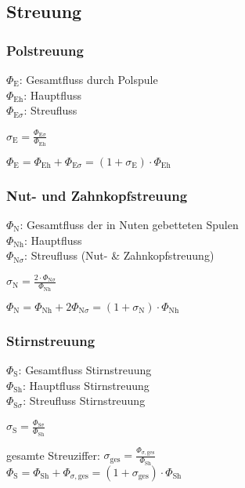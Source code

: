 \begin{sectionbox}
\subsection{Streuung}
\subsubsection{Polstreuung}
\begin{minipage}{0.7\columnwidth}
$\Phi_\text{E}$: Gesamtfluss durch Polspule \\
$\Phi_\text{Eh}$: Hauptfluss \\
$\Phi_{\text{E}\sigma}$: Streufluss
\end{minipage}
\begin{minipage}{0.25\columnwidth}
$\sigma_\text{E} = \frac{\Phi_{\text{E}\sigma}}{\Phi_\text{Eh}}$
\end{minipage}
$\Phi_\text{E} = \Phi_\text{Eh} + \Phi_{\text{E}\sigma} = (1+\sigma_\text{E})\cdot \Phi_\text{Eh}$
\\
\subsubsection{Nut- und Zahnkopfstreuung}
\begin{minipage}{0.7\columnwidth}
$\Phi_\text{N}$: Gesamtfluss der in Nuten gebetteten Spulen\\
$\Phi_\text{Nh}$: Hauptfluss\\
$\Phi_{\text{N}\sigma}$: Streufluss (Nut- \& Zahnkopfstreuung)
\end{minipage}
\begin{minipage}{0.25\columnwidth}
$\sigma_\text{N}=\frac{2 \cdot \Phi_{\text{N}\sigma}}{\Phi_\text{Nh}}$
\end{minipage}
$\Phi_\text{N} = \Phi_\text{Nh} + 2\Phi_{\text{N}\sigma} = (1 + \sigma_\text{N})\cdot\Phi_\text{Nh}$
\\
\subsubsection{Stirnstreuung}
\begin{minipage}{0.7\columnwidth}
$\Phi_\text{S}$: Gesamtfluss Stirnstreuung\\
$\Phi_\text{Sh}$: Hauptfluss Stirnstreuung\\
$\Phi_{\text{S}\sigma}$: Streufluss Stirnstreuung
\end{minipage}
\begin{minipage}{0.25\columnwidth}
$\sigma_\text{S}=\frac{\Phi_{\text{S}\sigma}}{\Phi_\text{Sh}}$
\end{minipage}
gesamte Streuziffer: $\sigma_\text{ges}=\frac{\Phi_{\sigma, \text{ges}}}{\Phi_\text{Sh}}$\\
$\Phi_\text{S} = \Phi_\text{Sh} + \Phi_{\sigma,\text{ges}} = (1+\sigma_\text{ges})\cdot \Phi_\text{Sh}$
\\

\end{sectionbox}
